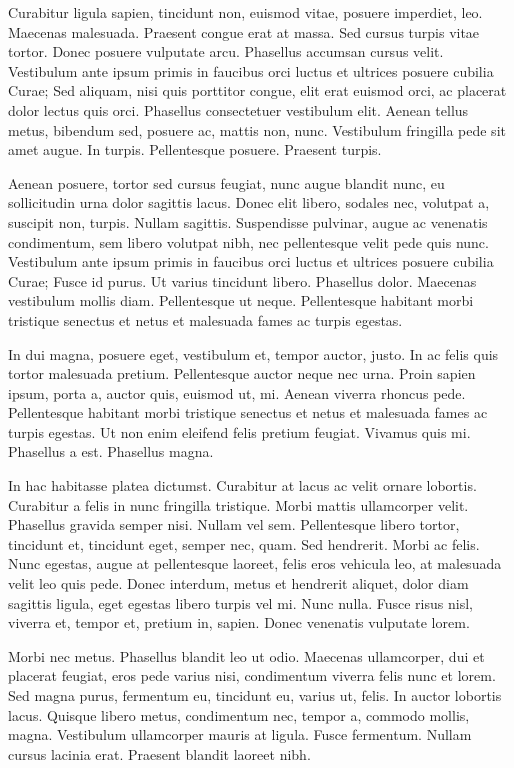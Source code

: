 \begin{multicols}{2}
Curabitur ligula sapien, tincidunt non, euismod vitae, posuere
imperdiet, leo. Maecenas malesuada. Praesent congue erat at massa. Sed
cursus turpis vitae tortor. Donec posuere vulputate arcu. Phasellus
accumsan cursus velit. Vestibulum ante ipsum primis in faucibus orci
luctus et ultrices posuere cubilia Curae; Sed aliquam, nisi quis
porttitor congue, elit erat euismod orci, ac placerat dolor lectus
quis orci. Phasellus consectetuer vestibulum elit. Aenean tellus
metus, bibendum sed, posuere ac, mattis non, nunc. Vestibulum
fringilla pede sit amet augue. In turpis. Pellentesque posuere.
Praesent turpis.

Aenean posuere, tortor sed cursus feugiat, nunc augue blandit nunc, eu
sollicitudin urna dolor sagittis lacus. Donec elit libero, sodales
nec, volutpat a, suscipit non, turpis. Nullam sagittis. Suspendisse
pulvinar, augue ac venenatis condimentum, sem libero volutpat nibh,
nec pellentesque velit pede quis nunc. Vestibulum ante ipsum primis in
faucibus orci luctus et ultrices posuere cubilia Curae; Fusce id
purus. Ut varius tincidunt libero. Phasellus dolor. Maecenas
vestibulum mollis diam. Pellentesque ut neque. Pellentesque habitant
morbi tristique senectus et netus et malesuada fames ac turpis
egestas.

In dui magna, posuere eget, vestibulum et, tempor auctor, justo. In ac
felis quis tortor malesuada pretium. Pellentesque auctor neque nec
urna. Proin sapien ipsum, porta a, auctor quis, euismod ut, mi. Aenean
viverra rhoncus pede. Pellentesque habitant morbi tristique senectus
et netus et malesuada fames ac turpis egestas. Ut non enim eleifend
felis pretium feugiat. Vivamus quis mi. Phasellus a est. Phasellus
magna.

In hac habitasse platea dictumst. Curabitur at lacus ac velit ornare
lobortis. Curabitur a felis in nunc fringilla tristique. Morbi mattis
ullamcorper velit. Phasellus gravida semper nisi. Nullam vel sem.
Pellentesque libero tortor, tincidunt et, tincidunt eget, semper nec,
quam. Sed hendrerit. Morbi ac felis. Nunc egestas, augue at
pellentesque laoreet, felis eros vehicula leo, at malesuada velit leo
quis pede. Donec interdum, metus et hendrerit aliquet, dolor diam
sagittis ligula, eget egestas libero turpis vel mi. Nunc nulla. Fusce
risus nisl, viverra et, tempor et, pretium in, sapien. Donec venenatis
vulputate lorem.

Morbi nec metus. Phasellus blandit leo ut odio. Maecenas ullamcorper,
dui et placerat feugiat, eros pede varius nisi, condimentum viverra
felis nunc et lorem. Sed magna purus, fermentum eu, tincidunt eu,
varius ut, felis. In auctor lobortis lacus. Quisque libero metus,
condimentum nec, tempor a, commodo mollis, magna. Vestibulum
ullamcorper mauris at ligula. Fusce fermentum. Nullam cursus lacinia
erat. Praesent blandit laoreet nibh.


\end{multicols}
